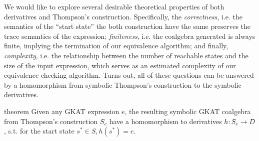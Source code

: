 \documentclass[conference]{IEEEtran}
\begin{document}
We would like to explore several desirable theoretical properties of both derivatives and Thompson's construction.
Specifically, the \emph{correctness}, i.e. the semantics of the ``start state'' the both construction have the same preserves the trace semantics of the expression; \emph{finiteness}, i.e. the coalgebra generated is always finite, implying the termination of our equivalence algorithm; and finally, \emph{complexity}, i.e. the relationship between the number of reachable states and the size of the input expression, which serves as an estimated complexity of our equivalence checking algorithm.
Turns out, all of these questions can be answered by a homomorphism from symbolic Thompson's construction to the symbolic derivatives.

\begin{theoremEnd}{theorem}\label{thm:hom-thompson-derivative}
    Given any GKAT expression \(e\), the resulting symbolic GKAT coalgebra from Thompson's construction \(Ŝ_e\) have a homomorphism to derivatives \(h: Ŝ_e → D̂\), s.t. for the start state \(s^* ∈ S, h(s^*) = e\).
\end{theoremEnd}
\end{document}
